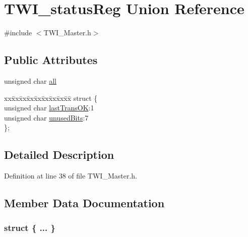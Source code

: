 \hypertarget{union_t_w_i__status_reg}{}\section{T\+W\+I\+\_\+status\+Reg Union Reference}
\label{union_t_w_i__status_reg}


{\ttfamily \#include $<$T\+W\+I\+\_\+\+Master.\+h$>$}

\subsection*{Public Attributes}
\begin{DoxyCompactItemize}
\item 
unsigned char \hyperlink{union_t_w_i__status_reg_a2c785e2c969f463d0062bb8234f70e1e}{all}
\item 
\begin{tabbing}
xx\=xx\=xx\=xx\=xx\=xx\=xx\=xx\=xx\=\kill
struct \{\\
\>unsigned char \hyperlink{union_t_w_i__status_reg_a98323b7aa41aee4b3fce127337f8eaea}{lastTransOK}:1\\
\>unsigned char \hyperlink{union_t_w_i__status_reg_ad3ab9c3b66a34ac741f6157f6bbd226b}{unusedBits}:7\\
\}; \\

\end{tabbing}\end{DoxyCompactItemize}


\subsection{Detailed Description}


Definition at line 38 of file T\+W\+I\+\_\+\+Master.\+h.



\subsection{Member Data Documentation}
\subsubsection[{\texorpdfstring{"@1}{@1}}]{\setlength{\rightskip}{0pt plus 5cm}struct \{ ... \} }\hypertarget{union_t_w_i__status_reg_add7d1a7a0e0ddd8a960f89dd9aa97b0f}{}\label{union_t_w_i__status_reg_add7d1a7a0e0ddd8a960f89dd9aa97b0f}
